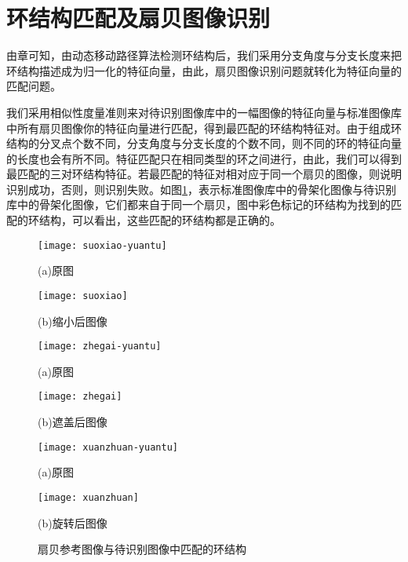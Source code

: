 \section{环结构匹配及扇贝图像识别}
\label{}

由\label{cha:cycle}章可知，由动态移动路径算法检测环结构后，我们采用分支角度与分支长度来把环结构描述成为归一化的特征向量，由此，扇贝图像识别问题就转化为特征向量的匹配问题。

我们采用相似性度量准则来对待识别图像库中的一幅图像的特征向量与标准图像库中所有扇贝图像你的特征向量进行匹配，得到最匹配的环结构特征对。由于组成环结构的分叉点个数不同，分支角度与分支长度的个数不同，则不同的环的特征向量的长度也会有所不同。特征匹配只在相同类型的环之间进行，由此，我们可以得到最匹配的三对环结构特征。若最匹配的特征对相对应于同一个扇贝的图像，则说明识别成功，否则，则识别失败。如图\ref{fig:recognition}，表示标准图像库中的骨架化图像与待识别库中的骨架化图像，它们都来自于同一个扇贝，图中彩色标记的环结构为找到的匹配的环结构，可以看出，这些匹配的环结构都是正确的。

\begin{figure}
\centering
  \begin{minipage}[b]{0.48\textwidth} 
      \centering 
      \texttt{[image: suoxiao-yuantu]}
        \centerline{(a)原图}\medskip
    \end{minipage}
  \begin{minipage}[b]{0.48\textwidth}
    \centering
    \texttt{[image: suoxiao]}
      \centerline{(b)缩小后图像}\medskip
    \end{minipage}
  \begin{minipage}[b]{0.48\textwidth} 
      \centering 
      \texttt{[image: zhegai-yuantu]}
        \centerline{(a)原图}\medskip
    \end{minipage}
  \begin{minipage}[b]{0.48\textwidth}
    \centering
    \texttt{[image: zhegai]}
      \centerline{(b)遮盖后图像}\medskip
    \end{minipage}
  \begin{minipage}[b]{0.48\textwidth} 
      \centering 
      \texttt{[image: xuanzhuan-yuantu]}
        \centerline{(a)原图}\medskip
    \end{minipage}
  \begin{minipage}[b]{0.48\textwidth}
    \centering
    \texttt{[image: xuanzhuan]}
      \centerline{(b)旋转后图像}\medskip
    \end{minipage}
\caption{扇贝参考图像与待识别图像中匹配的环结构}
\label{fig:recognition}
\end{figure}

